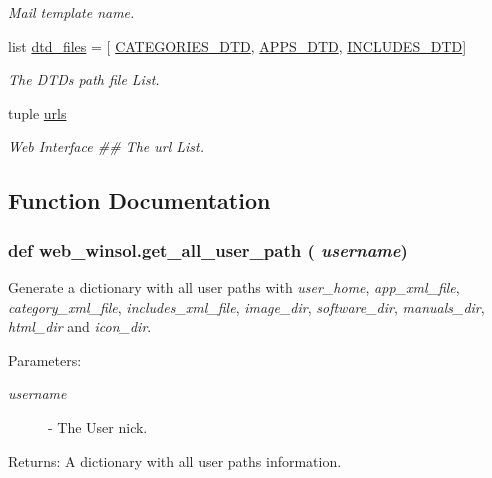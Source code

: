 \begin{CompactItemize}
\begin{CompactList}\small\item\em Mail template name. \item\end{CompactList}\item 
list \hyperlink{namespaceweb__winsol_85f622b96ce208dd36284f86e6a74183}{dtd\_\-files} = \mbox{[} \hyperlink{namespaceweb__winsol_2eb695d5ff57aa0a09995d8622b60efd}{CATEGORIES\_\-DTD}, \hyperlink{namespaceweb__winsol_83be49c783105f474efdcf2e83370b85}{APPS\_\-DTD}, \hyperlink{namespaceweb__winsol_85237de6fb02ee9c3fdd831318d9c73f}{INCLUDES\_\-DTD}\mbox{]}
\begin{CompactList}\small\item\em The DTDs path file List. \item\end{CompactList}\item 
tuple \hyperlink{namespaceweb__winsol_225bff55507b6e7c91a86ea03ba9b942}{urls}
\begin{CompactList}\small\item\em Web Interface \#\# The url List. \item\end{CompactList}\end{CompactItemize}


\subsection{Function Documentation}
\hypertarget{namespaceweb__winsol_348f54eacdfbf5e3a5577ce3c166ab36}{
\subsubsection[get\_\-all\_\-user\_\-path]{\setlength{\rightskip}{0pt plus 5cm}def web\_\-winsol.get\_\-all\_\-user\_\-path ( {\em username})}}
\label{namespaceweb__winsol_348f54eacdfbf5e3a5577ce3c166ab36}


Generate a dictionary with all user paths with {\em user\_\-home\/}, {\em app\_\-xml\_\-file\/}, {\em category\_\-xml\_\-file\/}, {\em includes\_\-xml\_\-file\/}, {\em image\_\-dir\/}, {\em software\_\-dir\/}, {\em manuals\_\-dir\/}, {\em html\_\-dir\/} and {\em icon\_\-dir\/}. 

\begin{Desc}
\item[Parameters:]
\begin{description}
\item[{\em username}]- The User nick. \end{description}
\end{Desc}
\begin{Desc}
\item[Returns:]A dictionary with all user paths information. \end{Desc}


